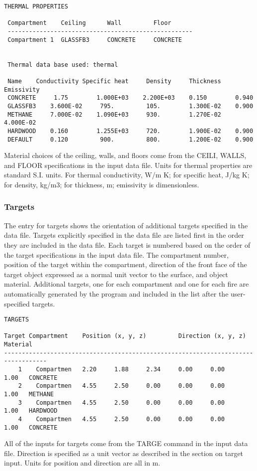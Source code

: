 \begin{lstlisting}[basicstyle=\scriptsize]
 THERMAL PROPERTIES

 Compartment    Ceiling      Wall         Floor
 ----------------------------------------------------
 Compartment 1  GLASSFB3     CONCRETE     CONCRETE


 Thermal data base used: thermal

 Name    Conductivity Specific heat     Density     Thickness   Emissivity
 CONCRETE     1.75        1.000E+03    2.200E+03    0.150        0.940
 GLASSFB3    3.600E-02     795.         105.        1.300E-02    0.900
 METHANE     7.000E-02    1.090E+03     930.        1.270E-02    4.000E-02
 HARDWOOD    0.160        1.255E+03     720.        1.900E-02    0.900
 DEFAULT     0.120         900.         800.        1.200E-02    0.900
\end{lstlisting}
Material choices of the ceiling, walls, and floors come from the CEILI, WALLS, and FLOOR specifications in the input data file. Units for thermal properties are standard S.I. units.  For thermal conductivity, W/m K; for specific heat, J/kg K; for density, kg/m3; for thickness, m; emissivity is dimensionless.


\subsubsection{Targets}

The entry for targets shows the orientation of additional targets specified in the data file. Targets explicitly specified in the data file are listed first in the order they are included in the data file.  Each target is numbered based on the order of the target specifications in the input data file.  The compartment number, position of the target within the compartment, direction of the front face of the target object expressed as a normal unit vector to the surface, and object material. Additional targets, one for each compartment and one for each fire are automatically generated by the program and included in the list after the user-specified targets.

\begin{lstlisting}[basicstyle=\scriptsize]
TARGETS

Target Compartment    Position (x, y, z)         Direction (x, y, z)      Material
----------------------------------------------------------------------------------
    1    Compartmen   2.20     1.88     2.34     0.00     0.00     1.00   CONCRETE
    2    Compartmen   4.55     2.50     0.00     0.00     0.00     1.00   METHANE
    3    Compartmen   4.55     2.50     0.00     0.00     0.00     1.00   HARDWOOD
    4    Compartmen   4.55     2.50     0.00     0.00     0.00     1.00   CONCRETE
\end{lstlisting}
All of the inputs for targets come from the TARGE command in the input data file. Direction is specified as a unit vector as described in the section on target input. Units for position and direction are all in m.


